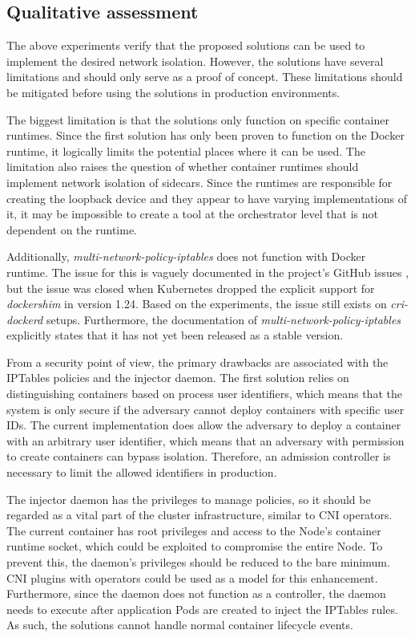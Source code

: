 \documentclass[english, 12pt, a4paper, sci, utf8, a-2b, online]{aaltothesis}
\begin{document}
\subsection{Qualitative assessment}

The above experiments verify that the proposed solutions can be used to implement the desired network isolation.
However, the solutions have several limitations and should only serve as a proof of concept.
These limitations should be mitigated before using the solutions in production environments.

The biggest limitation is that the solutions only function on specific container runtimes.
Since the first solution has only been proven to function on the Docker runtime, it logically limits the potential places where it can be used.
The limitation also raises the question of whether container runtimes should implement network isolation of sidecars.
Since the runtimes are responsible for creating the loopback device and they appear to have varying implementations of it, it may be impossible to create a tool at the orchestrator level that is not dependent on the runtime.

Additionally, \emph{multi-network-policy-iptables} does not function with Docker runtime.
The issue for this is vaguely documented in the project's GitHub issues \cite{multi-network-policy-iptables-bug}, but the issue was closed when Kubernetes dropped the explicit support for \emph{dockershim} in version 1.24.
Based on the experiments, the issue still exists on \emph{cri-dockerd} setups.
Furthermore, the documentation of \emph{multi-network-policy-iptables} explicitly states that it has not yet been released as a stable version.

From a security point of view, the primary drawbacks are associated with the IPTables policies and the injector daemon.
The first solution relies on distinguishing containers based on process user identifiers, which means that the system is only secure if the adversary cannot deploy containers with specific user IDs.
The current implementation does allow the adversary to deploy a container with an arbitrary user identifier, which means that an adversary with permission to create containers can bypass isolation.
Therefore, an admission controller is necessary to limit the allowed identifiers in production.

The injector daemon has the privileges to manage policies, so it should be regarded as a vital part of the cluster infrastructure, similar to CNI operators.
The current container has root privileges and access to the Node's container runtime socket, which could be exploited to compromise the entire Node.
To prevent this, the daemon's privileges should be reduced to the bare minimum.
CNI plugins with operators could be used as a model for this enhancement.
Furthermore, since the daemon does not function as a controller, the daemon needs to execute after application Pods are created to inject the IPTables rules.
As such, the solutions cannot handle normal container lifecycle events.
\end{document}
